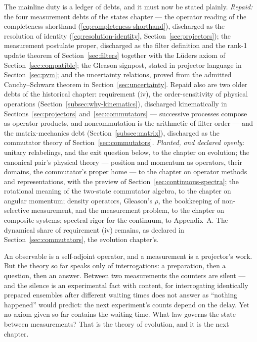 The mainline duty is a ledger of debts, and it must now be stated plainly. \emph{Repaid:} the four measurement debts of the states chapter --- the operator reading of the completeness shorthand (\eqref{eq:completeness-shorthand}), discharged as the resolution of identity (\eqref{eq:resolution-identity}, Section~\ref{sec:projectors}); the measurement postulate proper, discharged as the filter definition and the rank-1 update theorem of Section~\ref{sec:filters} together with the L\"uders axiom of Section~\ref{sec:compatible}; the Gleason signpost, stated in projector language in Section~\ref{sec:pvm}; and the uncertainty relations, proved from the admitted Cauchy--Schwarz theorem in Section~\ref{sec:uncertainty}. Repaid also are two older debts of the historical chapter: requirement (iv), the order-sensitivity of physical operations (Section~\ref{subsec:why-kinematics}), discharged kinematically in Sections~\ref{sec:projectors} and~\ref{sec:commutators} --- successive processes compose as operator products, and noncommutation is the arithmetic of filter order --- and the matrix-mechanics debt (Section~\ref{subsec:matrix}), discharged as the commutator theory of Section~\ref{sec:commutators}. \emph{Planted, and declared openly:} unitary relabelings, and the exit question below, to the chapter on evolution; the canonical pair's physical theory --- position and momentum as operators, their domains, the commutator's proper home --- to the chapter on operator methods and representations, with the preview of Section~\ref{sec:continuous-spectra}; the rotational meaning of the two-state commutator algebra, to the chapter on angular momentum; density operators, Gleason's $\rho$, the bookkeeping of non-selective measurement, and the measurement problem, to the chapter on composite systems; spectral rigor for the continuum, to Appendix~A. The dynamical share of requirement (iv) remains, as declared in Section~\ref{sec:commutators}, the evolution chapter's.

An observable is a self-adjoint operator, and a measurement is a projector's work. But the theory so far speaks only of interrogations: a preparation, then a question, then an answer. Between two measurements the counters are silent --- and the silence is an experimental fact with content, for interrogating identically prepared ensembles after different waiting times does not answer as ``nothing happened'' would predict: the next experiment's counts depend on the delay. Yet no axiom given so far contains the waiting time. What law governs the state between measurements? That is the theory of evolution, and it is the next chapter.

